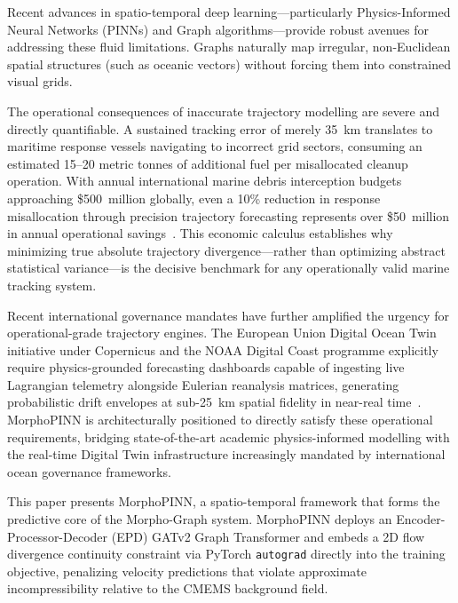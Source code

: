 \documentclass[conference]{IEEEtran}
\begin{document}
Recent advances in spatio-temporal deep learning---particularly Physics-Informed Neural Networks (PINNs) and Graph algorithms---provide robust avenues for addressing these fluid limitations. Graphs naturally map irregular, non-Euclidean spatial structures (such as oceanic vectors) without forcing them into constrained visual grids.

The operational consequences of inaccurate trajectory modelling are severe and directly quantifiable. A sustained tracking error of merely 35~km translates to maritime response vessels navigating to incorrect grid sectors, consuming an estimated 15--20 metric tonnes of additional fuel per misallocated cleanup operation. With annual international marine debris interception budgets approaching \$500~million globally, even a 10\% reduction in response misallocation through precision trajectory forecasting represents over \$50~million in annual operational savings~\cite{ref39}. This economic calculus establishes why minimizing true absolute trajectory divergence---rather than optimizing abstract statistical variance---is the decisive benchmark for any operationally valid marine tracking system.

Recent international governance mandates have further amplified the urgency for operational-grade trajectory engines. The European Union Digital Ocean Twin initiative under Copernicus and the NOAA Digital Coast programme explicitly require physics-grounded forecasting dashboards capable of ingesting live Lagrangian telemetry alongside Eulerian reanalysis matrices, generating probabilistic drift envelopes at sub-25~km spatial fidelity in near-real time~\cite{ref43}. MorphoPINN is architecturally positioned to directly satisfy these operational requirements, bridging state-of-the-art academic physics-informed modelling with the real-time Digital Twin infrastructure increasingly mandated by international ocean governance frameworks.

This paper presents MorphoPINN, a spatio-temporal framework that forms the predictive core of the Morpho-Graph system. MorphoPINN deploys an Encoder-Processor-Decoder (EPD) GATv2 Graph Transformer and embeds a 2D flow divergence continuity constraint via PyTorch \texttt{autograd} directly into the training objective, penalizing velocity predictions that violate approximate incompressibility relative to the CMEMS background field.
\end{document}
